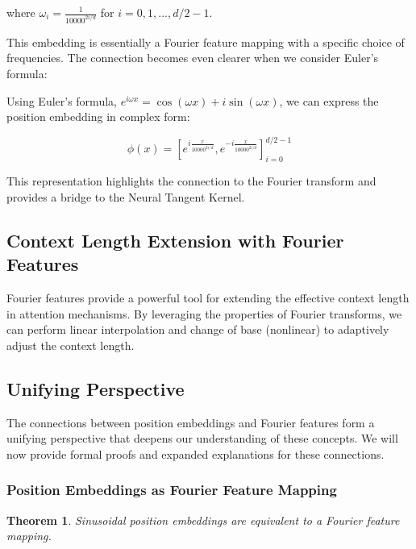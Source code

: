 \documentclass{article}
\newtheorem{theorem}{Theorem}
\begin{document}
where $\omega_i = \frac{1}{10000^{2i/d}}$ for $i = 0, 1, ..., d/2 - 1$.

This embedding is essentially a Fourier feature mapping with a specific choice of frequencies. The connection becomes even clearer when we consider Euler's formula:

Using Euler's formula, $e^{i\omega x} = \cos(\omega x) + i\sin(\omega x)$, we can express the position embedding in complex form:

\begin{equation}
    \phi(x) = \left[e^{i\frac{x}{10000^{2i/d}}}, e^{-i\frac{x}{10000^{2i/d}}}\right]_{i=0}^{d/2-1}
\end{equation}

This representation highlights the connection to the Fourier transform and provides a bridge to the Neural Tangent Kernel.

\subsection{Context Length Extension with Fourier Features}

Fourier features provide a powerful tool for extending the effective context length in attention mechanisms. By leveraging the properties of Fourier transforms, we can perform linear interpolation and change of base (nonlinear) to adaptively adjust the context length.

\subsection{Unifying Perspective}

The connections between position embeddings and Fourier features form a unifying perspective that deepens our understanding of these concepts. We will now provide formal proofs and expanded explanations for these connections.

\subsubsection{Position Embeddings as Fourier Feature Mapping}

\begin{theorem}
Sinusoidal position embeddings are equivalent to a Fourier feature mapping.
\end{theorem}
\end{document}
